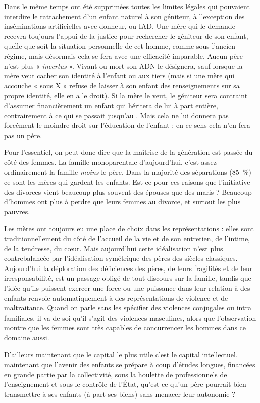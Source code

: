  Dans le même temps ont été supprimées toutes les limites légales qui pouvaient interdire le rattachement d'un enfant naturel à son géniteur, à l'exception des inséminations artificielles avec donneur, ou IAD. Une mère qui le demande recevra toujours l'appui de la justice pour rechercher le géniteur de son enfant, quelle que soit la situation personnelle de cet homme, comme sous l'ancien régime, mais désormais cela se fera avec une efficacité  imparable. Aucun père n'est plus « \emph{incertus} ». Vivant ou mort son ADN le désignera, sauf lorsque la mère veut cacher son identité à l'enfant ou aux tiers (mais si une mère qui accouche « sous X » refuse de laisser à son enfant des renseignements sur sa propre identité, elle en a le droit). Si la mère le veut, le géniteur sera contraint d'assumer financièrement un enfant qui héritera de lui à part entière, contrairement à ce qui se passait jusqu'au . Mais cela ne lui donnera pas forcément le moindre droit sur l'éducation de l'enfant : en ce sens cela n'en fera pas un père.

 Pour l'essentiel, on peut donc dire que la maîtrise de la génération est passée du côté des femmes. La famille monoparentale d'aujourd'hui, c'est assez ordinairement la famille \emph{moins} le père. Dans la majorité des séparations (85~\%) ce sont les mères qui gardent les enfants. Est-ce pour ces raisons que l'initiative des divorces vient beaucoup plus souvent des épouses que des maris ? Beaucoup d'hommes ont plus à perdre que leurs femmes au divorce, et surtout les plus pauvres. 

 Les mères ont toujours eu une place de choix dans les représentations : elles sont traditionnellement du côté de l'accueil de la vie et de son entretien, de l'intime, de la tendresse, du cœur. Mais aujourd'hui cette idéalisation n'est plus contrebalancée par l'idéalisation symétrique des pères des siècles classiques. Aujourd'hui la déploration des déficiences des pères, de leurs fragilités et de leur irresponsabilité, est un passage obligé de tout discours sur la famille, tandis que l'idée qu'ils puissent exercer une force ou une puissance dans leur relation à des enfants renvoie automatiquement à des représentations de violence et de maltraitance. Quand on parle sans les spécifier des violences conjugales ou intra familiales, il va de soi qu'il s'agit des violences masculines, alors que l'observation montre que les femmes sont très capables de concurrencer les hommes dans ce domaine aussi. 

 D'ailleurs maintenant que le capital le plus utile c'est le capital intellectuel, maintenant que l'avenir des enfants se prépare à coup d'études longues, financées en grande partie par la collectivité, sous la houlette de professionnels de l'enseignement et sous le contrôle de l'État, qu'est-ce qu'un père pourrait bien transmettre à ses enfants (à part ses biens) sans menacer leur autonomie ?

